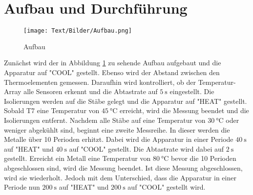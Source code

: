 \section{Aufbau und Durchführung}
\begin{figure}[H]
  \texttt{[image: Text/Bilder/Aufbau.png]}
  \caption{Aufbau \cite[3]{sample1}}
  \label{fig:Aufbau}
\end{figure}
Zunächst wird der in Abbildung \ref{fig:Aufbau} zu sehende Aufbau aufgebaut und die Apparatur auf "COOL" gestellt.
Ebenso wird der Abstand zwischen den Thermoelementen gemessen.
Daraufhin wird kontrolliert, ob der Temperatur-Array alle Sensoren erkennt und die Abtastrate auf $\SI{5}{\s}$ eingestellt.
Die Isolierungen werden auf die Stäbe gelegt und die Apparatur auf "HEAT" gestellt. Sobald T7 eine Temperatur von
$\SI{45}{\celsius}$ erreicht, wird die Messung beendet und die Isolierungen entfernt.
Nachdem alle Stäbe auf eine Temperatur von $\SI{30}{\celsius}$ oder weniger abgekühlt sind, beginnt eine zweite Messreihe.
In dieser werden die Metalle über 10 Perioden erhitzt. Dabei wird die Apparatur in einer Periode $\SI{40}{\s}$ auf "HEAT"
und $\SI{40}{\s}$ auf "COOL" gestellt. Die Abtastrate wird dabei auf $\SI{2}{\s}$ gestellt.
Erreicht ein Metall eine Temperatur von $\SI{80}{\celsius}$ bevor die 10 Perioden abgeschlossen sind, wird die Messung beendet.
Ist diese Messung abgeschlossen, wird sie wiederholt. Jedoch mit dem Unterschied, dass die Apparatur in einer Periode
nun $\SI{200}{\s}$ auf "HEAT" und $\SI{200}{\s}$ auf "COOL" gestellt wird.
